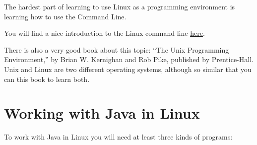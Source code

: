 \documentclass[a4paper, 12pt]{article}
\begin{document}
The hardest part of learning to use Linux as a programming environment is
learning how to use the Command Line.

You will find a nice introduction to the Linux command line
\href{http://linuxcommand.org/lc3_learning_the_shell.php#contents}{here}.

There is also a very good book about this topic: ``The Unix Programming
Environment,'' by Brian W. Kernighan and Rob Pike, published by Prentice-Hall.
Unix and Linux are two different operating systems, although so similar that
you can this book to learn both.


\section{Working with Java in Linux}

To work with Java in Linux you will need at least three kinds of programs:
\end{document}
